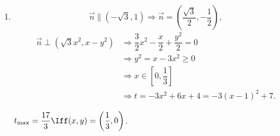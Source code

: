 \documentclass[8pt]{article}
\begin{document}
\begin{easonbigproblem}
\begin{enumerate} [label = \calword{(\arabic*)}]
\begin{align*}
									 &= 
									 \left[\sqrt{3}, 1\right]
									 \left[
										\begin{array}{cc}
											\frac{1}{2} & \frac{\sqrt{3}}{2}\\
											- \frac{\sqrt{3}}{2} & \frac{1}{2}
										\end{array}
									\right]\\
									 &= \left[0, 2\right], k = 2, \vect{n} = \left[0, 1\right].
						\end{align*}
				\item \[\vec{n} \parallel \left(-\sqrt{3}, 1\right) \Rightarrow \vec{n} = \left(\dfrac{\sqrt{3}}{2}, -\dfrac{1}{2}\right),\]
				\begin{align*}
					\vec{n} \perp \left(\sqrt{3}x^2, x-y^2\right) &\Rightarrow \dfrac{3}{2} x^2 - \dfrac{x}{2} + \dfrac{y^2}{2} = 0\\
					&\Rightarrow y^2 = x - 3x^2 \geq 0\\
					&\Rightarrow x \in \left[0, \dfrac{1}{3}\right]\\
					&\Rightarrow t = -3x^2 + 6x + 4 = -3(x-1)^2 + 7.
				\end{align*}

				\(t_{\max} = \dfrac{17}{3} \Iff (x, y) = \left(\dfrac{1}{3}, 0\right)\).

			\end{enumerate}
		\end{easonbigproblem}
		
\end{document}
